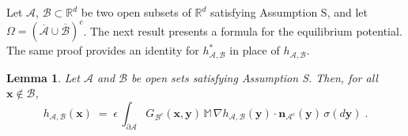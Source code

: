 \documentclass[reqno]{amsart}
\newtheorem{lemma}[theorem]{Lemma}
\newcommand{\mc}[1]{{\mathcal #1}}
\newcommand{\bb}[1]{{\mathbb #1}}
\newcommand{\bs}[1]{{\boldsymbol #1}}
\newcommand{\<}{\langle}
\renewcommand{\>}{\rangle}
\begin{document}
Let $\mc A$, $\mc B\subset\bb R^d$ be two open subsets of $\bb R^d$
satisfying Assumption S, and let $\Omega = (\overline{\mc A}\cup
\overline{\mc B})^c$.  The next result presents a formula for the
equilibrium potential. The same proof provides an identity for
$h^*_{\mc A,\mc B}$ in place of $h_{\mc A,\mc B}$.

\begin{lemma}
\label{7-l8}
Let $\mc A$ and $\mc B$ be open sets satisfying Assumption S. Then,
for all $\bs x\not\in\mc B$,
\begin{equation*}
h_{\mc A,\mc B} (\bs x) \;=\; \epsilon\, \int_{\partial \mc A}
G_{\mc B^c} (\bs x, \bs y)\, \bb M \, \nabla h_{\mc A,\mc B} (\bs y)
\cdot \bs n_{\mc A^c}(\bs y) \, \sigma(d \bs y)\;.
\end{equation*}
\end{lemma}
\end{document}
